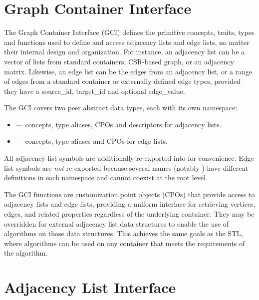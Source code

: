 
\clearpage
\section{Graph Container Interface}

The Graph Container Interface (GCI) defines the primitive concepts, traits, types and functions used to define and access adjacency lists
and edge lists, no matter their internal design and organization. For instance, an adjacency list can be a vector of lists from standard containers, 
CSR-based graph, or an adjacency matrix. Likewise, an edge list can be the edges from an adjacency list, or a range of edges from a standard container 
or externally defined edge types, provided they have a source\_id, target\_id and optional edge\_value.

The GCI covers two peer abstract data types, each with its own namespace:
\begin{itemize}
    \item {} --- concepts, type aliases, CPOs and descriptors for adjacency lists.
    \item {} --- concepts, type aliases and CPOs for edge lists.
\end{itemize}
All adjacency list symbols are additionally re-exported into  for convenience. Edge list
symbols are \emph{not} re-exported because several names (notably ) have different
definitions in each namespace and cannot coexist at the root level.


The GCI functions are customization point objects (CPOs) that provide access to adjacency lists and edge lists, providing
a uniform interface for retrieving vertices, edges, and related properties regardless of the underlying container.
They may be overridden for external adjacency list data structures to enable the use of algorithms on those data 
structures. This achieves the same goals as the STL, where algorithms can be used on any container that meets 
the requirements of the algorithm.

\section{Adjacency List Interface}


